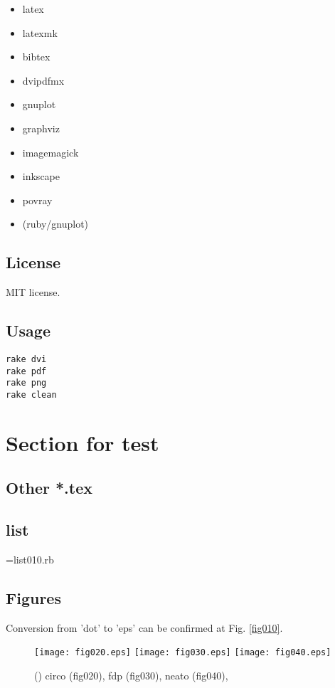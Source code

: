 \documentclass[a4paper,12pt]{jsarticle}
\begin{document}
\begin{itemize}
  \item latex
  \item latexmk
  \item bibtex
  \item dvipdfmx
  \item gnuplot
  \item graphviz
  \item imagemagick
  \item inkscape
  \item povray
  \item (ruby/gnuplot)
\end{itemize}

\subsection{License}

MIT license.

\subsection{Usage}

\begin{verbatim}
rake dvi
rake pdf
rake png
rake clean
\end{verbatim}


\section{Section for test}

\subsection{Other *.tex}



\subsection{list}

\tmpId={list010.rb}



\subsection{Figures}

Conversion from 'dot' to 'eps' can be confirmed at Fig. \ref{fig010}.

\begin{figure}[!htbp]
  \begin{center}
  \texttt{[image: fig020.eps]} %
  \texttt{[image: fig030.eps]} %
  \texttt{[image: fig040.eps]} %
  \end{center}
  \caption{(\the\tmpId)
    \label{fig020_030_040}
    circo (fig020),
    fdp (fig030),
    neato (fig040),
  }
\end{figure}
\end{document}
